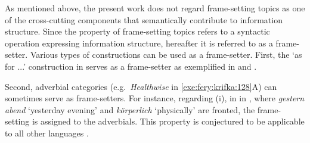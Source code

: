 









As mentioned above, the present work does not regard frame-setting
topics as one of the cross-cutting components that semantically
contribute to information structure.  Since the property of
frame-setting topics refers to a syntactic operation expressing
information structure, hereafter it is referred to as a frame-setter.
Various types of constructions can be used as a frame-setter.  First,
the `as for ...'  construction in  serves as a frame-setter as
exemplified in  and
.




\noindent Second, adverbial categories (e.g.\ \textit{Healthwise} in
\ref{exe:fery:krifka:128}A) can sometimes serve as frame-setters.
For instance, regarding (i), in  in
, where \textit{gestern abend} `yesterday evening' and
\textit{k\"orperlich} `physically' are fronted, the frame-setting
 is assigned to the adverbials.  This property is conjectured to
be applicable to all other languages \citep{chafe:76,lambrecht:96}.




